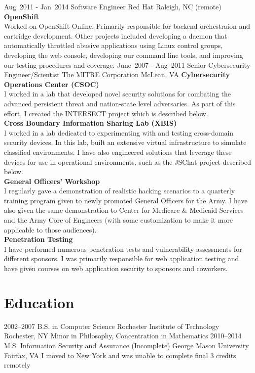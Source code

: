 \documentclass[11pt,letterpaper,sans]{moderncv}
\begin{document}
\cventry
{
\mbox{Aug 2011}
-
\mbox{Jan 2014}
}
{Software Engineer}
{Red Hat}
{Raleigh, NC (remote)}
{}
{
\textbf{OpenShift} \\
Worked on OpenShift Online.
Primarily responsible for backend orchestraion and cartridge development.
Other projects included
developing a daemon that automatically throttled abusive applications using Linux control groups,
developing the web console,
developing our command line tools,
and improving our testing procedures and coverage.
}
\cventry
{
\mbox{June 2007}
-
\mbox{Aug 2011}
}
{Senior Cybersecurity Engineer/Scientist}
{The MITRE Corporation}
{McLean, VA}
{}
{
\textbf{Cybersecurity Operations Center (CSOC)} \\
I worked in a lab that developed novel security solutions for combating the advanced persistent threat and nation-state level adversaries.
As part of this effort, I created the INTERSECT project which is described below.
\\
\textbf{Cross Boundary Information Sharing Lab (XBIS)} \\
I worked in a lab dedicated to experimenting with and testing cross-domain security devices.
In this lab, built an extensive virtual infrastructure to simulate classified environments.
I have also engineered solutions that leverage these devices for use in operational environments, such as the JSChat project described below.
\\
\textbf{General Officers' Workshop} \\
I regularly gave a demonstration of realistic hacking scenarios to a quarterly training program given to newly promoted General Officers for the Army.
I have also given the same demonstration to Center for Medicare \& Medicaid Services and the Army Core of Engineers (with some customization to make it more applicable to those audiences).
\\
\textbf{Penetration Testing} \\
I have performed numerous penetration tests and vulnerability assessments for different sponsors.
I was primarily responsible for web application testing and have given courses on web application security to sponsors and coworkers.
}
\section{Education}
\cventry
{2002--2007}
{B.S. in Computer Science}
{Rochester Institute of Technology}
{Rochester, NY}
{}
{Minor in Philosophy, Concentration in Mathematics}
\cventry
{2010--2014}
{M.S. Information Security and Assurance (Incomplete)}
{George Mason University}
{Fairfax, VA}
{}
{I moved to New York and was unable to complete final 3 credits remotely}
\end{document}
